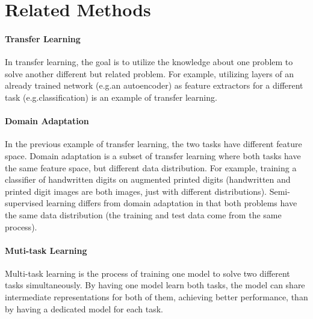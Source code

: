 \section{Related Methods}
\label{sec:RelatedSslMethods}

\paragraph*{Transfer Learning} In transfer learning, the goal is to utilize the knowledge about one problem to solve another different but related problem. For example, utilizing layers of an already trained network (e.g.\@ an autoencoder) as feature extractors for a different task (e.g.\@ classification) is an example of transfer learning.

\paragraph*{Domain Adaptation} In the previous example of transfer learning, the two tasks have different feature space. Domain adaptation is a subset of transfer learning where both tasks have the same feature space, but different data distribution. For example, training a classifier of handwritten digits on augmented printed digits (handwritten and printed digit images are both images, just with different distributions). Semi-supervised learning differs from domain adaptation in that both problems have the same data distribution (the training and test data come from the same process).

\paragraph*{Muti-task Learning} Multi-task learning is the process of training one model to solve two different tasks simultaneously. By having one model learn both tasks, the model can share intermediate representations for both of them, achieving better performance, than by having a dedicated model for each task.
